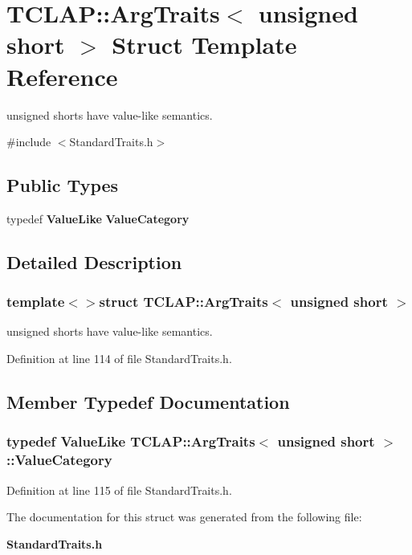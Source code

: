 \section{T\+C\+L\+A\+P\+:\+:Arg\+Traits$<$ unsigned short $>$ Struct Template Reference}
\label{structTCLAP_1_1ArgTraits_3_01unsigned_01short_01_4}


unsigned shorts have value-\/like semantics.  




{\ttfamily \#include $<$Standard\+Traits.\+h$>$}

\subsection*{Public Types}
\begin{DoxyCompactItemize}
\item 
typedef {\bf Value\+Like} {\bf Value\+Category}
\end{DoxyCompactItemize}


\subsection{Detailed Description}
\subsubsection*{template$<$$>$struct T\+C\+L\+A\+P\+::\+Arg\+Traits$<$ unsigned short $>$}

unsigned shorts have value-\/like semantics. 

Definition at line 114 of file Standard\+Traits.\+h.



\subsection{Member Typedef Documentation}
\subsubsection[{Value\+Category}]{\setlength{\rightskip}{0pt plus 5cm}typedef {\bf Value\+Like} {\bf T\+C\+L\+A\+P\+::\+Arg\+Traits}$<$ unsigned short $>$\+::{\bf Value\+Category}}\label{structTCLAP_1_1ArgTraits_3_01unsigned_01short_01_4_a0efa2ce53e9cb98dc4a58dda24127d3a}


Definition at line 115 of file Standard\+Traits.\+h.



The documentation for this struct was generated from the following file\+:\begin{DoxyCompactItemize}
\item 
{\bf Standard\+Traits.\+h}\end{DoxyCompactItemize}
